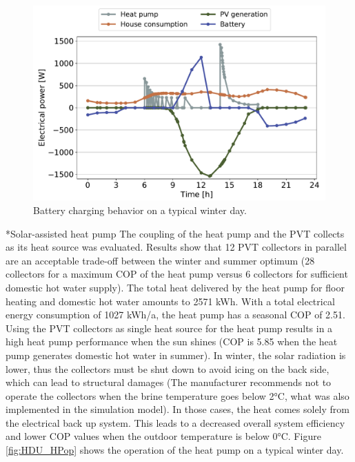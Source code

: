 \documentclass[twocolumn, a4paper,10pt]{article}
\makeatletter
\renewcommand\subsection{\@startsection{subsection}{1}{\z@}{\z@}{\z@}{\normalfont\normalsize\bfseries}}
\renewcommand\subsection{\@startsection{subsection}{1}{\z@}{\z@}{0.1pt}{\normalfont\normalsize\bfseries}}
\makeatother
\begin{document}
\begin{figure}[ht]
\vspace{-5pt} 
\centering
\includegraphics[scale=0.34]{img/HDU_ELbal.pdf}
\caption{Battery charging behavior on a typical winter day.}
\label{fig:HDU_ELbal}
\end{figure}

\subsection*{Solar-assisted heat pump}
The coupling of the heat pump and the PVT collects as its heat source was evaluated. Results show that 12 PVT collectors in parallel are an acceptable trade-off between the winter and summer optimum (28 collectors for a maximum COP of the heat pump versus 6 collectors for sufficient domestic hot water supply). The total heat delivered by the heat pump for floor heating and domestic hot water amounts to 2571 kWh. With a total electrical energy consumption of 1027 kWh/a, the heat pump has a seasonal COP of 2.51. Using the PVT collectors as single heat source for the heat pump results in a high heat pump performance when the sun shines (COP is 5.85 when the heat pump generates domestic hot water in summer). In winter, the solar radiation is lower, thus the collectors must be shut down to avoid icing on the back side, which can lead to structural damages (The manufacturer recommends not to operate the collectors when the brine temperature goes below 2°C, what was also implemented in the simulation model). In those cases, the heat comes solely from the electrical back up system. This leads to a decreased overall system efficiency and lower COP values when the outdoor temperature is below 0°C. Figure \ref{fig:HDU_HPop} shows the operation of the heat pump on a typical winter day.\\
\end{document}
